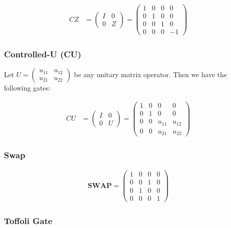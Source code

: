 \documentclass[11pt]{article}
\begin{document}
\begin{align}
CZ &= \begin{pmatrix} I & 0 \\ 0 & Z \end{pmatrix} = 
\begin{pmatrix} 
1 & 0 & 0 & 0 \\
0 & 1 & 0 & 0 \\
0 & 0 & 1 & 0 \\
0 & 0 & 0 & -1
\end{pmatrix}
\end{align}

    \hypertarget{controlled-u-cu}{%
\subsubsection{Controlled-U (CU)}\label{controlled-u-cu}}

Let
\(U = \begin{pmatrix} u_{11} & u_{12} \\ u_{21} & u_{22} \end{pmatrix}\)
be any unitary matrix operator. Then we have the following gates:

\begin{align}
CU &= \begin{pmatrix} I & 0 \\ 0 & U \end{pmatrix} = 
\begin{pmatrix} 
1 & 0 & 0 & 0 \\
0 & 1 & 0 & 0 \\
0 & 0 & u_{11} & u_{12} \\
0 & 0 & u_{21} & u_{22}
\end{pmatrix}
\end{align}

    \hypertarget{swap}{%
\subsubsection{Swap}\label{swap}}

\begin{align}
\mathbf{SWAP} = \begin{pmatrix}
1 & 0 & 0 & 0 \\
0 & 0 & 1 & 0 \\
0 & 1 & 0 & 0 \\
0 & 0 & 0 & 1 
\end{pmatrix}
\end{align}

    \hypertarget{toffoli-gate}{%
\subsubsection{Toffoli Gate}\label{toffoli-gate}}
\end{document}
